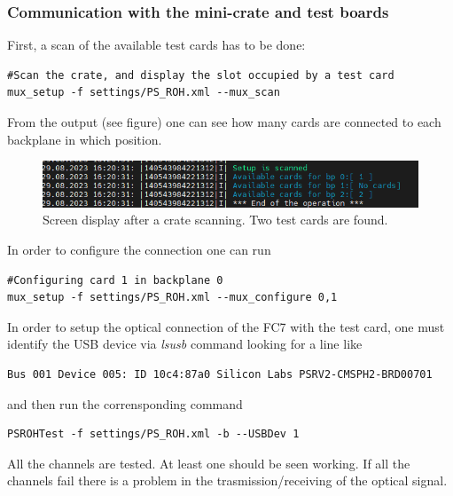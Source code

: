 \documentclass[10pt,a4paper]{article}
\begin{document}
\subsubsection{Communication with the mini-crate and test boards}
First, a scan of the available test cards has to be done:
\begin{framed}
\begin{verbatim}
#Scan the crate, and display the slot occupied by a test card
mux_setup -f settings/PS_ROH.xml --mux_scan
\end{verbatim}
\end{framed}
From the output (see figure) one can see how many cards are connected to each backplane in which position.
\begin{figure}[h!]
\centering
 \includegraphics[width=\linewidth]{mux_scan.png} 
  \caption{Screen display after a crate scanning. Two test cards are found.}
\end{figure}
In order to configure the connection one can run 
\begin{framed}
\begin{verbatim}
#Configuring card 1 in backplane 0
mux_setup -f settings/PS_ROH.xml --mux_configure 0,1
\end{verbatim}
\end{framed}
In order to setup the optical connection of the FC7 with the test card, one must identify the USB device via {\it lsusb} command looking for a line like
\begin{framed}
\begin{verbatim}
Bus 001 Device 005: ID 10c4:87a0 Silicon Labs PSRV2-CMSPH2-BRD00701 
\end{verbatim}
\end{framed}
and then run the corrensponding command
\begin{framed}
\begin{verbatim}
PSROHTest -f settings/PS_ROH.xml -b --USBDev 1
\end{verbatim}
\end{framed}
 All the channels are tested. At least one should be seen working.
If all the channels fail there is a problem in the trasmission/receiving of the optical signal.
\end{document}
